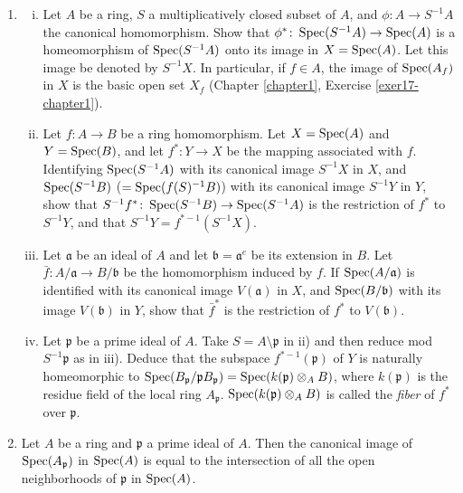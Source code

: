 \begin{enumerate}
    \item \label{exer21-chapter3} \begin{enumerate}[i)]
        \item Let $A$ be a ring, $S$ a multiplicatively closed subset of $A$, and $\phi \colon A \to S^{-1}A$ the canonical homomorphism. Show that $\phi^* \colon \operatorname{Spec}(S^{-1}A) \to \operatorname{Spec}(A)$ is a homeomorphism of $\operatorname{Spec}(S^{-1}A)$ onto its image in $X = \operatorname{Spec}(A)$. Let this image be denoted by $S^{-1}X$. In particular, if $f \in A$, the image of $\operatorname{Spec}(A_f)$ in $X$ is the basic open set $X_f$ (Chapter \ref{chapter1}, Exercise \ref{exer17-chapter1}).
        \item Let $f \colon A \to B$ be a ring homomorphism. Let $X = \operatorname{Spec}(A)$ and $Y = \operatorname{Spec}(B)$, and let $f^* \colon Y \to X$ be the mapping associated with $f$. Identifying $\operatorname{Spec}(S^{-1}A)$ with its canonical image $S^{-1}X$ in $X$, and $\operatorname{Spec}(S^{-1}B)$ ($= \operatorname{Spec}(f(S)^{-1}B)$) with its canonical image $S^{-1}Y$ in $Y$, show that $S^{-1}f^* \colon \operatorname{Spec}(S^{-1}B) \to \operatorname{Spec}(S^{-1}A)$ is the restriction of $f^*$ to $S^{-1}Y$, and that $S^{-1}Y = f^{*-1}(S^{-1}X)$.
        \item Let $\mathfrak{a}$ be an ideal of $A$ and let $\mathfrak{b} = \mathfrak{a}^e$ be its extension in $B$. Let $\bar{f} \colon A/\mathfrak{a} \to B/\mathfrak{b}$ be the homomorphism induced by $f$. If $\operatorname{Spec}(A/\mathfrak{a})$ is identified with its canonical image $V(\mathfrak{a})$ in $X$, and $\operatorname{Spec}(B/\mathfrak{b})$ with its image $V(\mathfrak{b})$ in $Y$, show that $\bar{f}^*$ is the restriction of $f^*$ to $V(\mathfrak{b})$.
        \item Let $\mathfrak{p}$ be a prime ideal of $A$. Take $S = A \setminus \mathfrak{p}$ in ii) and then reduce mod $S^{-1}\mathfrak{p}$ as in iii). Deduce that the subspace $f^{*-1}(\mathfrak{p})$ of $Y$ is naturally homeomorphic to $\operatorname{Spec}(B_{\mathfrak{p}}/\mathfrak{p}B_{\mathfrak{p}}) = \operatorname{Spec}(k(\mathfrak{p}) \otimes_A B)$, where $k(\mathfrak{p})$ is the residue field of the local ring $A_{\mathfrak{p}}$. $\operatorname{Spec}(k(\mathfrak{p}) \otimes_A B)$ is called the \emph{fiber} of $f^*$ over $\mathfrak{p}$.
    \end{enumerate}

    \item \label{exer22-chapter3}Let $A$ be a ring and $\mathfrak{p}$ a prime ideal of $A$. Then the canonical image of $\operatorname{Spec}(A_{\mathfrak{p}})$ in $\operatorname{Spec}(A)$ is equal to the intersection of all the open neighborhoods of $\mathfrak{p}$ in $\operatorname{Spec}(A)$.


\end{enumerate}
